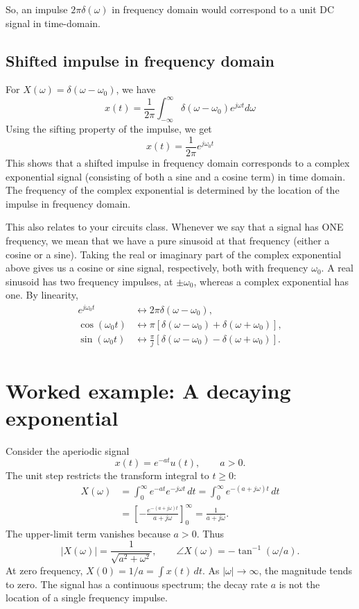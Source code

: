 So, an impulse $2\pi \delta(\omega)$ in frequency domain would correspond to a unit DC signal in time-domain.

\subsection{Shifted impulse in frequency domain}
For $X(\omega) = \delta(\omega - \omega_0)$, we have
\begin{equation*}
    x(t) = \frac{1}{2\pi} \int_{-\infty}^{\infty} \delta(\omega - \omega_0) e^{j\omega t} d\omega
\end{equation*}
Using the sifting property of the impulse, we get
\begin{equation*}
    x(t) = \frac{1}{2\pi} e^{j\omega_0 t}
\end{equation*}
This shows that a shifted impulse in frequency domain corresponds to a complex exponential signal (consisting of both a sine and a cosine term) in time domain. The frequency of the complex exponential is determined by the location of the impulse in frequency domain. 

This also relates to your circuits class. Whenever we say that a signal has ONE frequency, we mean that we have a pure sinusoid at that frequency (either a cosine or a sine). Taking the real or imaginary part of the complex exponential above gives us a cosine or sine signal, respectively, both with frequency $\omega_0$. A real sinusoid has two frequency impulses, at
$\pm\omega_0$, whereas a complex exponential has one. By linearity,
\[
\begin{aligned}
e^{j\omega_0t}&\longleftrightarrow 2\pi\delta(\omega-\omega_0),\\
\cos(\omega_0t)&\longleftrightarrow
 \pi[\delta(\omega-\omega_0)+\delta(\omega+\omega_0)],\\
\sin(\omega_0t)&\longleftrightarrow
 \frac{\pi}{j}[\delta(\omega-\omega_0)-\delta(\omega+\omega_0)].
\end{aligned}
\]

\section{Worked example: A decaying exponential}
\label{sec:w8l2-exponential-ft}
Consider the aperiodic signal
\[
x(t)=e^{-at}u(t),\qquad a>0.
\]
The unit step restricts the transform integral to $t\ge0$:
\begin{align*}
X(\omega)
&=\int_0^{\infty}e^{-at}e^{-j\omega t}\,dt
 =\int_0^{\infty}e^{-(a+j\omega)t}\,dt\\
&=\left[-\frac{e^{-(a+j\omega)t}}{a+j\omega}\right]_0^{\infty}
 =\frac{1}{a+j\omega}.
\end{align*}
The upper-limit term vanishes because $a>0$. Thus
\[
|X(\omega)|=\frac{1}{\sqrt{a^2+\omega^2}},\qquad
\angle X(\omega)=-\tan^{-1}(\omega/a).
\]
At zero frequency, $X(0)=1/a=\int x(t)\,dt$. As $|\omega|\to\infty$,
the magnitude tends to zero. The signal has a continuous spectrum; the
decay rate $a$ is not the location of a single frequency impulse.

